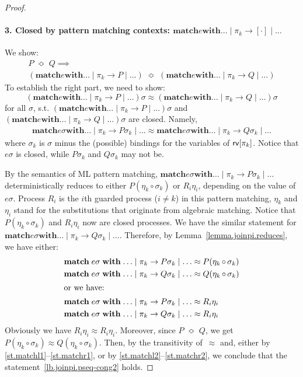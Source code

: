 \documentclass{LMCS}
\renewcommand{\exp}{e}
\newcommand{\pt}{\pi}
\newcommand{\kwd}[1]{\ensuremath{\mathbf{#1}}}
\newcommand{\prefix}[1]{\mathopen{}\mathrel{\kwd {#1}}}
\newcommand{\infix}[1]{\mathrel{\kwd {#1}}}
\renewcommand{\_}{\mathord{\rule[-.25ex]{1ex}{.15ex}}}
\newcommand{\composite}[2]{#1 \mathop{\circ} #2}
\newcommand{\wbc}{\mathrel{\approx}}
\newcommand{\pseq}{\;\mathop{\Bumpeq}\;}
\newcommand{\mctxt}[1]{\prefix{match} \exp \infix{with} \ldots \mid \pi_k
  \rightarrow #1 \mid \ldots}
\newcommand{\rv}[1]{\mbox{\sf rv}[#1]}
\begin{document}
\begin{proof}
  \paragraph{\bf 3. Closed by pattern matching contexts: $\mctxt{[\cdot]}$}
  We show: \begin{multline} P \pseq Q \implies \\ (\mctxt{P}) \pseq (\mctxt{Q})
  \end{multline}
  To establish the right part, we need to show: $$
  {(\mctxt{P})}{\sigma} \wbc {(\mctxt{Q})}{\sigma} $$
  for all $\sigma$, s.t. ${(\mctxt{P})}{\sigma}$ and ${(\mctxt{Q})}{\sigma}$
  are closed. Namely,
  \begin{align}
    \prefix{match} {\exp}{\sigma} \infix{with} \ldots \mid \pt_k
    \rightarrow {P}{\sigma_k} \mid \ldots \wbc \prefix{match}
    {\exp}{\sigma} \infix{with} \ldots \mid \pt_k \rightarrow
    {Q}{\sigma_k} \mid \ldots
    \label{lb.joinpi.pseq-cong2}
  \end{align}
  where $\sigma_k$ is $\sigma$ minus the (possible) bindings for the
  variables of $\rv{\pt_k}$. Notice that $e\sigma$ is closed, while
  $P\sigma_k$ and $Q\sigma_k$ may not be.

  By the semantics of ML pattern matching, $\prefix{match}
  {\exp}{\sigma} \infix{with} \ldots \mid \pt_k \rightarrow
  {P}{\sigma_k} \mid \ldots$ deterministically reduces to either
  ${P}{(\composite{\eta_k}{\sigma_k})}$ or ${R_i}{\eta_i}$, depending
  on the value of ${\exp}{\sigma}$.  Process $R_i$ is the $i$th
  guarded process ($i\neq k$) in this pattern matching, $\eta_k$ and
  $\eta_i$ stand for the substitutions that originate from algebraic
  matching.  Notice that ${P}{(\composite{\eta_k}{\sigma_k})}$ and
  ${R_i}{\eta_i}$ now are closed processes.  We have the similar
  statement for $\prefix{match}{\exp}{\sigma} \infix{with} \ldots \mid
  \pt_k \rightarrow {Q}{\sigma_k} \mid \ldots$.  Therefore, by
  Lemma~\ref{lemma.joinpi.reduces}, we have either:
  \begin{align}
    \label{st.matchl1}
    \prefix{match} {\exp}{\sigma}\infix{with}\ldots \mid\pt_k \rightarrow
    {P}{\sigma_k} \mid\ldots & \wbc
    {P}{(\composite{\eta_k}{\sigma_k})}    \\
    \label{st.matchr1}
    \prefix{match} {\exp}{\sigma} \infix{with}\ldots \mid\pt_k
    \rightarrow
    {Q}{\sigma_k} \mid\ldots & \wbc {Q}{(\composite{\eta_k}{\sigma_k})} \\
    \intertext{or we have:}
    \label{st.matchl2}
    \prefix{match} {\exp}{\sigma} \infix{with}\ldots \mid\pt_k
    \rightarrow {P}{\sigma_k} \mid\ldots & \wbc {R_i}{\eta_i}    \\
    \label{st.matchr2}
    \prefix{match}{\exp}{\sigma} \infix{with} \ldots \mid\pt_k \rightarrow
    {Q}{\sigma_k} \mid\ldots & \wbc {R_i}{\eta_i}
  \end{align}
  Obviously we have $R_i\eta_i \wbc R_i\eta_i$. Moreover, since $P
  \pseq Q$, we get ${P}{(\composite{\eta_k}{\sigma_k})} \wbc
  {Q}{(\composite{\eta_k}{\sigma_k})}$. Then, by the transitivity
  of~$\wbc$ and, either by \eqref{st.matchl1}--\eqref{st.matchr1}, or
  by \eqref{st.matchl2}--\eqref{st.matchr2}, we conclude that the
  statement~\eqref{lb.joinpi.pseq-cong2} holds.


\end{proof}
\end{document}
